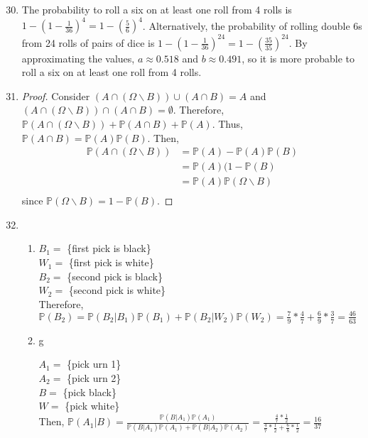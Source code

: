 \documentclass{article}
\begin{document}
\begin{enumerate}
    \setcounter{enumi}{29}
    \item 

    The probability to roll a six on at least one roll from 4 rolls is $1-(1-\frac{1}{36})^4=1-(\frac{5}{6})^4$. Alternatively, the probability of rolling double 6s from 24 rolls of pairs of dice is $1-(1-\frac{1}{36})^24=1-(\frac{35}{35})^24$. By approximating the values, $a \approx 0.518$ and $b \approx 0.491$, so it is more probable to roll a six on at least one roll from 4 rolls.

    \setcounter{enumi}{43}
    \item 
    
    \begin{proof}
    Consider $(A\cap(\Omega \backslash B))\cup (A\cap B)=A$ and $(A\cap(\Omega\backslash B))\cap(A\cap B)=\emptyset$. Therefore, $\mathbb{P}(A\cap (\Omega\backslash B))+\mathbb{P}(A\cap B)+\mathbb{P}(A)$. Thus, $\mathbb{P}(A\cap B)=\mathbb{P}(A)\mathbb{P}(B)$. Then, 
    \begin{align*}
    \mathbb{P}(A\cap (\Omega\backslash B)) &= \mathbb{P}(A)-\mathbb{P}(A)\mathbb{P}(B)\\
    &= \mathbb{P}(A)(1-\mathbb{P}(B)\\
    &= \mathbb{P}(A)\mathbb{P}(\Omega\backslash B)\\
    \end{align*}
    since $\mathbb{P}(\Omega\backslash B) = 1-\mathbb{P}(B)$.
    
    \end{proof}
    
    \setcounter{enumi}{51}
    \item 
    
    \begin{enumerate}
        \item 
        
        $B_1 = $ \{first pick is black\}\\
        $W_1 = $ \{first pick is white\}\\
        $B_2 = $ \{second pick is black\}\\
        $W_2 = $ \{second pick is white\}\\
        Therefore, $\mathbb{P}(B_2)=\mathbb{P}(B_2|B_1)\mathbb{P}(B_1) + \mathbb{P}(B_2|W_2)\mathbb{P}(W_2) = \frac{7}{9}*\frac{4}{7}+\frac{6}{9}*\frac{3}{7}=\frac{46}{63}$
        
        \item g
        
        $A_1 = $ \{pick urn 1\}\\
        $A_2 = $ \{pick urn 2\}\\
        $B = $ \{pick black\}\\
        $W = $ \{pick white\}\\
        Then, $\mathbb{P}(A_1|B) = \frac{\mathbb{P}(B|A_1)\mathbb{P}(A_1)}{\mathbb{P}(B|A_1)\mathbb{P}(A_1)+\mathbb{P}(B|A_2)\mathbb{P}(A_2)}=\frac{\frac{4}{7}*\frac{1}{2}}{\frac{4}{7}*\frac{1}{2}+\frac{6}{8}*\frac{1}{2}} = \frac{16}{37}$
        
    \end{enumerate}


\end{enumerate}
\end{document}
